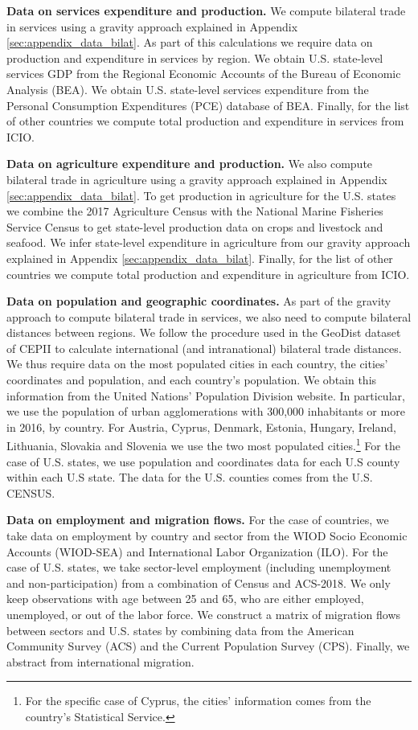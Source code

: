 \documentclass[12pt]{article}
\begin{document}
\textbf{Data on services expenditure and production.} We compute bilateral trade in services using a gravity approach explained in Appendix \ref{sec:appendix_data_bilat}. As part of this calculations we require data on production and expenditure in services by region. We obtain U.S. state-level services GDP from the Regional Economic Accounts of the Bureau of Economic Analysis (BEA). We obtain U.S. state-level services expenditure from the Personal Consumption Expenditures (PCE) database of BEA. Finally, for the list of other countries we compute total production and expenditure in services from ICIO.

\textbf{Data on agriculture expenditure and production.}  We also compute bilateral trade in agriculture using a gravity approach explained in Appendix \ref{sec:appendix_data_bilat}. To get production in agriculture for the U.S. states we combine the 2017 Agriculture Census with the National Marine Fisheries Service Census to get state-level production data on crops and livestock and seafood. We infer state-level expenditure in agriculture from our gravity approach explained in Appendix \ref{sec:appendix_data_bilat}. Finally, for the list of other countries we compute total production and expenditure in agriculture from ICIO. 

\textbf{Data on population and geographic coordinates.} As part of the gravity approach to compute bilateral trade in services, we also need to compute bilateral distances between regions. We follow the procedure used in the GeoDist dataset of CEPII to calculate international (and intranational) bilateral trade distances. We thus require data on the most populated cities in each country, the cities' coordinates and population, and each country's population. We obtain this information from the United Nations' Population Division website. In particular, we use the population of urban agglomerations with 300,000 inhabitants or more in 2016, by country. For Austria, Cyprus, Denmark, Estonia, Hungary, Ireland, Lithuania, Slovakia and Slovenia we use the two most populated cities.\footnote{For the specific case of Cyprus, the cities' information comes from the country's Statistical Service.} For the case of U.S. states, we use population and coordinates data for each U.S county within each U.S state. The data for the U.S. counties comes from the U.S. CENSUS. 

\textbf{Data on employment and migration flows.} For the case of countries, we take data on employment by country and sector from the WIOD Socio Economic Accounts (WIOD-SEA) and International Labor Organization (ILO). For the case of U.S. states, we take sector-level employment (including unemployment and non-participation) from a combination of Census and ACS-2018. We only keep observations with age between 25 and 65, who are either employed, unemployed, or out of the labor force. We construct a matrix of migration flows between sectors and U.S. states by combining data from the American Community Survey (ACS) and the Current Population Survey (CPS). Finally, we abstract from international migration.
\end{document}
